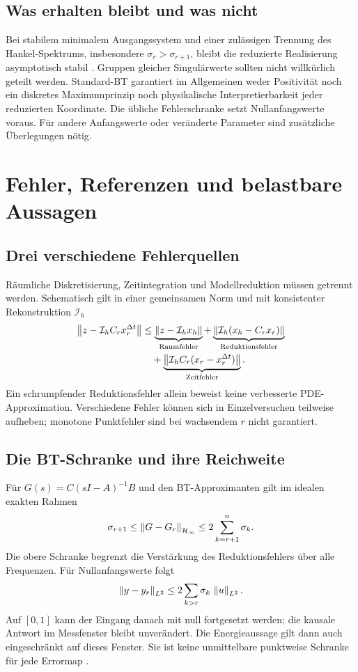 \subsection{Was erhalten bleibt und was nicht}
Bei stabilem minimalem Ausgangssystem und einer zulässigen Trennung des Hankel-Spektrums, insbesondere $\sigma_r>\sigma_{r+1}$, bleibt die reduzierte Realisierung asymptotisch stabil \cite{lall}. Gruppen gleicher Singulärwerte sollten nicht willkürlich geteilt werden. Standard-BT garantiert im Allgemeinen weder Positivität noch ein diskretes Maximumprinzip noch physikalische Interpretierbarkeit jeder reduzierten Koordinate. Die übliche Fehlerschranke setzt Nullanfangswerte voraus. Für andere Anfangswerte oder veränderte Parameter sind zusätzliche Überlegungen nötig.

\section{Fehler, Referenzen und belastbare Aussagen}
\subsection{Drei verschiedene Fehlerquellen}
Räumliche Diskretisierung, Zeitintegration und Modellreduktion müssen getrennt werden. Schematisch gilt in einer gemeinsamen Norm und mit konsistenter Rekonstruktion $\mathcal I_h$
\begin{align}
 \left\lVert z-\mathcal I_h C_r x_r^{\Delta t}\right\rVert
 &\le \underbrace{\left\lVert z-\mathcal I_h x_h\right\rVert}_{\text{Raumfehler}}
 +\underbrace{\left\lVert\mathcal I_h(x_h-C_rx_r)\right\rVert}_{\text{Reduktionsfehler}}\\
 &\quad+\underbrace{\left\lVert\mathcal I_h C_r(x_r-x_r^{\Delta t})\right\rVert}_{\text{Zeitfehler}}.
\end{align}
Ein schrumpfender Reduktionsfehler allein beweist keine verbesserte PDE-Approximation. Verschiedene Fehler können sich in Einzelversuchen teilweise aufheben; monotone Punktfehler sind bei wachsendem $r$ nicht garantiert.

\subsection{Die BT-Schranke und ihre Reichweite}
Für $G(s)=C(sI-A)^{-1}B$ und den BT-Approximanten gilt im idealen exakten Rahmen
\begin{equation}\label{eq:btbound}
 \sigma_{r+1}\le\left\lVert G-G_r\right\rVert_{\mathcal{H}_\infty}\le 2\sum_{k=r+1}^{n}\sigma_k.
\end{equation}
Die obere Schranke begrenzt die Verstärkung des Reduktionsfehlers über alle Frequenzen. Für Nullanfangswerte folgt
\begin{equation}
 \left\lVert y-y_r\right\rVert_{L^2}\le 2\sum_{k>r}\sigma_k\,\left\lVert u\right\rVert_{L^2}.
\end{equation}
Auf $[0,1]$ kann der Eingang danach mit null fortgesetzt werden; die kausale Antwort im Messfenster bleibt unverändert. Die Energieaussage gilt dann auch eingeschränkt auf dieses Fenster. Sie ist keine unmittelbare punktweise Schranke für jede Errormap \cite{lall,lower}.

